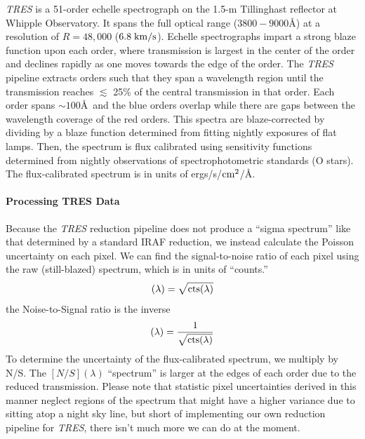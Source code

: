 \documentclass[preprint]{aastex} %
\begin{document}
\emph{TRES} is a 51-order echelle spectrograph on the 1.5-m Tillinghast reflector at Whipple Observatory. It spans the full optical range ($3800-9000$\AA) at a resolution of $R=48,000$ ($6.8\;{\rm km/s}$). Echelle spectrographs impart a strong blaze function upon each order, where transmission is largest in the center of the order and declines rapidly as one moves towards the edge of the order. The \emph{TRES} pipeline extracts orders such that they span a wavelength region until the transmission reaches $\lesssim$ 25\% of the central transmission in that order. Each order spans $\sim 100$\AA\ and the blue orders overlap while there are gaps between the wavelength coverage of the red orders. This spectra are blaze-corrected by dividing by a blaze function determined from fitting nightly exposures of flat lamps. Then, the spectrum is flux calibrated using sensitivity functions determined from nightly observations of spectrophotometric standards (O stars). The flux-calibrated spectrum is in units of ergs/s/${\rm cm}^2$/\AA.

\paragraph{Processing TRES Data}
\label{sec:TRES}
Because the \emph{TRES} reduction pipeline does not produce a ``sigma spectrum'' like that determined by a standard IRAF reduction, we instead calculate the Poisson uncertainty on each pixel. We can find the signal-to-noise ratio of each pixel using the raw (still-blazed) spectrum, which is in units of ``counts.''
\begin{equation}
  [S/N](\lambda) = \sqrt{ {\rm cts}(\lambda)}
\end{equation}
the Noise-to-Signal ratio is the inverse 
\begin{equation}
  [N/S](\lambda) = \frac{1}{\sqrt{ {\rm cts}(\lambda)}}
\end{equation}
To determine the uncertainty of the flux-calibrated spectrum, we multiply by N/S. The $[N/S](\lambda)$ ``spectrum'' is larger at the edges of each order due to the reduced transmission. Please note that statistic pixel uncertainties derived in this manner neglect regions of the spectrum that might have a higher variance due to sitting atop a night sky line, but short of implementing our own reduction pipeline for \emph{TRES}, there isn't much more we can do at the moment.
\end{document}
